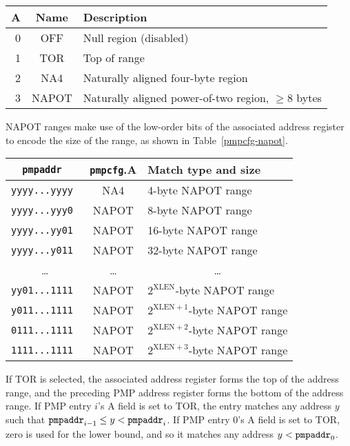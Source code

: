 \begin{table*}[h!]
\begin{center}
\begin{tabular}{|r|c|l|}
\hline
A & Name & Description \\
\hline
0 & OFF   & Null region (disabled) \\
1 & TOR   & Top of range \\
2 & NA4   & Naturally aligned four-byte region \\
3 & NAPOT & Naturally aligned power-of-two region, $\ge$8 bytes \\
\hline
\end{tabular}
\end{center}
\caption{Encoding of A field in PMP configuration registers.}
\label{pmpcfg-a}
\end{table*}

NAPOT ranges make use of the low-order bits of the associated address register
to encode the size of the range, as shown in Table~\ref{pmpcfg-napot}.

\begin{table*}[h!]
\begin{center}
  \begin{tabular}{|c|c|l|}
  \hline
  \tt pmpaddr    & {\tt pmpcfg}.A & Match type and size \\
  \hline
  \tt yyyy...yyyy & NA4   & 4-byte NAPOT range \\
  \tt yyyy...yyy0 & NAPOT & 8-byte NAPOT range \\
  \tt yyyy...yy01 & NAPOT & 16-byte NAPOT range \\
  \tt yyyy...y011 & NAPOT & 32-byte NAPOT range \\
  \multicolumn{1}{|c|}{\ldots} &  \ldots  & \multicolumn{1}{|c|}{\ldots} \\
  \tt yy01...1111 & NAPOT & $2^{\text{XLEN}}$-byte NAPOT range \\
  \tt y011...1111 & NAPOT & $2^{\text{XLEN}+1}$-byte NAPOT range \\
  \tt 0111...1111 & NAPOT & $2^{\text{XLEN}+2}$-byte NAPOT range \\
  \tt 1111...1111 & NAPOT & $2^{\text{XLEN}+3}$-byte NAPOT range \\
  \hline
  \end{tabular}
\end{center}
\caption{NAPOT range encoding in PMP address and configuration registers.}
\label{pmpcfg-napot}
\end{table*}

If TOR is selected, the associated address register forms the top of the
address range, and the preceding PMP address register forms the bottom of the
address range.  If PMP entry $i$'s A field is set to TOR, the entry matches
any address $y$ such that ${\tt pmpaddr}_{i-1}\leq y < {\tt pmpaddr}_i$.  If
PMP entry 0's A field is set to TOR, zero is used for the lower bound, and so
it matches any address $y < {\tt pmpaddr}_0$.

